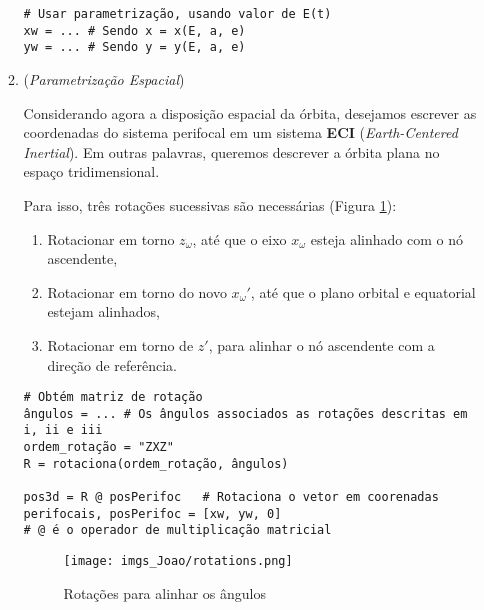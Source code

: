 \documentclass[9pt]{article}
\begin{document}
\begin{enumerate}[label=$\blacktriangleright$ {\bf Exercício \arabic*},series=exerc,align=left]
\begin{enumerate}[label=(\alph*)]
\begin{verbatim}
# Usar parametrização, usando valor de E(t)
xw = ... # Sendo x = x(E, a, e)
yw = ... # Sendo y = y(E, a, e)
    \end{verbatim}

    \item (\textit{Parametrização Espacial}) 
    
    Considerando agora a disposição espacial da órbita, desejamos escrever as coordenadas do sistema perifocal em um sistema \textbf{ECI} (\textit{Earth-Centered Inertial}). Em outras palavras, queremos descrever a órbita plana no espaço tridimensional.
    
    Para isso, três rotações sucessivas são necessárias (Figura \ref{fig:rotations}):
    \begin{enumerate}
        \item Rotacionar em torno $z_\omega$, até que o eixo $x_\omega$ esteja alinhado com o nó ascendente,
        \item Rotacionar em torno do novo $x_\omega'$, até que o plano orbital e equatorial estejam alinhados,
        \item Rotacionar em torno de $z'$, para alinhar o nó ascendente com a direção de referência.
    \end{enumerate}

        \begin{verbatim}
# Obtém matriz de rotação
ângulos = ... # Os ângulos associados as rotações descritas em i, ii e iii
ordem_rotação = "ZXZ"
R = rotaciona(ordem_rotação, ângulos)

pos3d = R @ posPerifoc   # Rotaciona o vetor em coorenadas perifocais, posPerifoc = [xw, yw, 0]
# @ é o operador de multiplicação matricial
    \end{verbatim}

    \begin{figure}[H]
        \centering
        \texttt{[image: imgs\_Joao/rotations.png]}
        \caption{Rotações para alinhar os ângulos}
        \label{fig:rotations}
    \end{figure}
\end{enumerate}


\end{enumerate}
\end{document}
